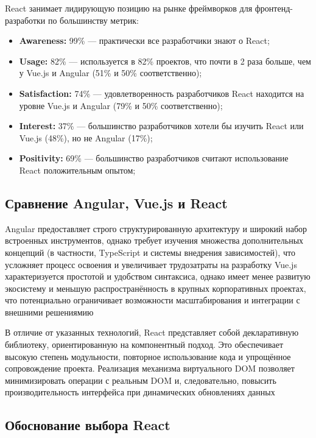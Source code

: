 React занимает лидирующую позицию на рынке фреймворков для фронтенд-разработки по большинству метрик:

\begin{itemize}
	\item \textbf{Awareness:} 99\% --- практически все разработчики знают о React;
	\item \textbf{Usage:} 82\% --- используется в 82\% проектов, что почти в 2 раза больше, чем у Vue.js и Angular (51\% и 50\% соответственно);
	\item \textbf{Satisfaction:} 74\% --- удовлетворенность разработчиков React находится на уровне Vue.js и Angular (79\% и 50\% соответственно);
	\item \textbf{Interest:} 37\% --- большинство разработчиков хотели бы изучить React или Vue.js (48\%), но не Angular (17\%);
	\item \textbf{Positivity:} 69\% --- большинство разработчиков считают использование React положительным опытом;
\end{itemize}


\subsection*{Сравнение Angular, Vue.js и React}

Angular предоставляет строго структурированную архитектуру и широкий набор
встроенных инструментов, однако требует изучения множества дополнительных концепций
(в частности, TypeScript и системы внедрения зависимостей), что усложняет процесс освоения и увеличивает трудозатраты на разработку
Vue.js характеризуется простотой и удобством синтаксиса, однако имеет менее развитую
экосистему и меньшую распространённость в крупных корпоративных проектах, что
потенциально ограничивает возможности масштабирования и интеграции с внешними решениямию

В отличие от указанных технологий, React представляет собой декларативную библиотеку,
ориентированную на компонентный подход. Это обеспечивает высокую степень модульности, 
повторное использование кода и упрощённое сопровождение проекта. Реализация 
механизма виртуального DOM позволяет минимизировать операции с реальным DOM
и, следовательно, повысить производительность интерфейса при динамических обновлениях данных

\subsection{Обоснование выбора React}

